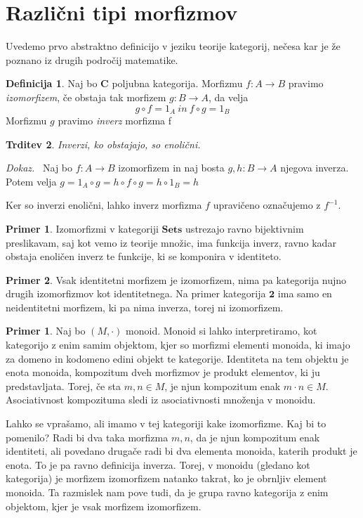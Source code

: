 \documentclass[12pt,a4paper]{book}
\theoremstyle{definition}
\newtheorem{definicija}{Definicija}[chapter]
\theoremstyle{plain}
\newtheorem{trditev}[definicija]{Trditev}
\newenvironment{dokaz}{\emph{Dokaz.}\ }{\hspace{\fill}{$\Box$}}
\theoremstyle{definition}
\newtheorem{primer}{Primer}[section]
\newtheorem*{primer*}{Primer}
\theoremstyle{remark}
\newcommand{\cat}[1]{\textbf{#1}}
\begin{document}
\section{Različni tipi morfizmov}
Uvedemo prvo abstraktno definicijo v jeziku teorije kategorij, nečesa kar je že poznano iz drugih področij matematike.

\begin{definicija} Naj bo \cat{C} poljubna kategorija. Morfizmu $f : A \to B$ pravimo \emph{izomorfizem}, če obstaja tak morfizem $g : B \to A$, da velja
$$g \circ f = 1_A \ in \ f \circ g = 1_B$$
Morfizmu $g$ pravimo \emph{inverz} morfizma f
\end{definicija}

\begin{trditev} Inverzi, ko obstajajo, so enolični.
\end{trditev}
\begin{dokaz}
Naj bo $f : A \to B$ izomorfizem in naj bosta $g,h: B \to A$ njegova inverza. Potem velja $g = 1_A \circ g = h \circ f \circ g = h \circ 1_B = h$
\end{dokaz}

Ker so inverzi enolični, lahko inverz morfizma $f$ upravičeno označujemo z $f^{-1}$.

\begin{primer*}
Izomorfizmi v kategoriji $\cat{Sets}$ ustrezajo ravno bijektivnim preslikavam, saj kot vemo iz teorije množic, ima funkcija inverz, ravno kadar obstaja enoličen inverz te funkcije, ki se komponira v identiteto. 
\end{primer*}

\begin{primer*}
Vsak identitetni morfizem je izomorfizem, nima pa kategorija nujno drugih izomorfizmov kot identitetnega. Na primer kategorija $\cat{2}$ ima samo en neidentitetni morfizem, ki pa nima inverza, torej ni izomorfizem.
\end{primer*}

\begin{primer}
Naj bo $(M,\cdot)$ monoid. Monoid si lahko interpretiramo, kot kategorijo z enim samim objektom, kjer so morfizmi elementi monoida, ki imajo za domeno in kodomeno edini objekt te kategorije. Identiteta na tem objektu je enota monoida, kompozitum dveh morfizmov je produkt elementov, ki ju predstavljata. Torej, če sta $m,n \in M$, je njun kompozitum enak $m \cdot n \in M$. Asociativnost kompozituma sledi iz asociativnosti množenja v monoidu.

Lahko se vprašamo, ali imamo v tej kategoriji kake izomorfizme. Kaj bi to pomenilo? Radi bi dva taka morfizma $m,n$, da je njun kompozitum enak identiteti, ali povedano drugače radi bi dva elementa monoida, katerih produkt je enota. To je pa ravno definicija inverza. Torej, v monoidu (gledano kot kategorija) je morfizem izomorfizem natanko takrat, ko je obrnljiv element monoida. Ta razmislek nam pove tudi, da je grupa ravno kategorija z enim objektom, kjer je vsak morfizem izomorfizem.
\end{primer}
\end{document}
